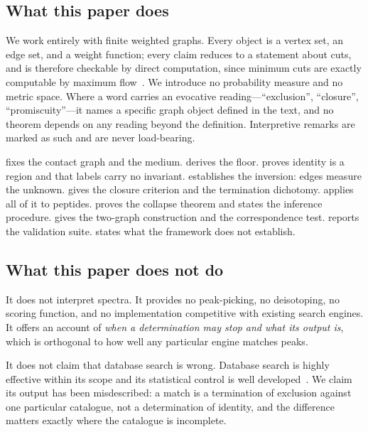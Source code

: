 \documentclass[11pt,a4paper]{article}
\theoremstyle{definition}
\theoremstyle{remark}
\begin{document}
\subsection{What this paper does}

We work entirely with finite weighted graphs. Every object is a vertex
set, an edge set, and a weight function; every claim reduces to a
statement about cuts, and is therefore checkable by direct
computation, since minimum cuts are exactly computable by maximum
flow~\citep{fordfulkerson1956,goldberg1988new,stoerwagner1997}. We
introduce no probability measure and no metric space. Where a word
carries an evocative reading---``exclusion'', ``closure'',
``promiscuity''---it names a specific graph object defined in the text,
and no theorem depends on any reading beyond the definition.
Interpretive remarks are marked as such and are never load-bearing.

 fixes the contact graph and the medium.
 derives the floor.  proves identity
is a region and that labels carry no invariant. 
establishes the inversion: edges measure the unknown.
 gives the closure criterion and the termination
dichotomy.  applies all of it to peptides.
 proves the collapse theorem and states the
inference procedure.  gives the two-graph
construction and the correspondence test.  reports
the validation suite.  states what the framework
does not establish.

\subsection{What this paper does not do}

It does not interpret spectra. It provides no peak-picking, no
deisotoping, no scoring function, and no implementation competitive with
existing search engines. It offers an account of \emph{when a
determination may stop and what its output is}, which is orthogonal to
how well any particular engine matches peaks.

It does not claim that database search is wrong. Database search is
highly effective within its scope and its statistical
control is well developed~\citep{elias2007target,kall2007semi,the2016fast}.
We claim its output has been misdescribed: a match is a termination of
exclusion against one particular catalogue, not a determination of
identity, and the difference matters exactly where the catalogue is
incomplete.
\end{document}

